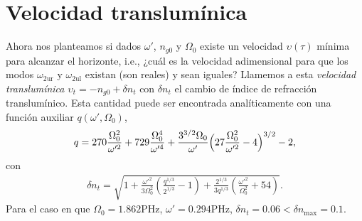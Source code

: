 \section{Velocidad translum\'{i}nica}
Ahora nos planteamos si dados $\omega'$, $n_{g0}$ y $\Omega_0$ existe un velocidad $\upsilon(\tau)$ m\'{i}nima para alcanzar  el horizonte, i.e., ¿cu\'{a}l es la velocidad adimensional para que los modos $\omega_{\text{2ur}}$ y $\omega_{\text{2ul}}$ existan (son reales) y sean iguales? Llamemos a esta \textit{velocidad} \textit{translum\'{i}nica} $\upsilon_{t}=-n_{g0}+\delta n_{t}$ con $\delta n_{t}$ el cambio de \'{i}ndice de refracci\'{o}n translum\'inico. Esta cantidad puede ser encontrada anal\'{i}ticamente con una funci\'{o}n auxiliar $q(\omega',\Omega_0)$,
\begin{align}
q=270\frac{\Omega_0^2}{\omega'^2}+729\frac{\Omega_0^4}{\omega'^4}+\frac{3^{3/2}\Omega_0}{\omega'}\Bigl(27\frac{\Omega_0^2}{\omega'^2}-4\Bigr)^{3/2}-2,
\end{align}
con
\begin{align}
\delta n_{t}=\sqrt{1+\frac{\omega'^2}{3\Omega_0^2}\left(\frac{q^{1/3}}{2^{1/3}}-1\right)+\frac{2^{1/3}}{3q^{1/3}}\left(\frac{\omega'^2}{\Omega^2_0}+54\right)}.
\end{align}
Para el caso en que $\Omega_0=1.862\text{PHz}$, $\omega'=0.294\text{PHz}$, $\delta n_t=0.06<\delta n_{\text{max}}=0.1$.



